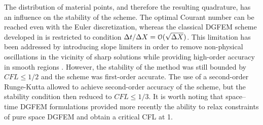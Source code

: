 The distribution of material points, and therefore the resulting quadrature, has an influence on the stability of the scheme. The optimal Courant number can be reached even with the Euler discretization, whereas the classical DGFEM scheme developed in \cite{Chavent_Salzano} is restricted to condition $\Delta t / \Delta X = \mathcal{O}(\sqrt{\Delta X})$. This limitation has been addressed by introducing slope limiters in order to remove non-physical oscillations in the vicinity of sharp solutions while providing high-order accuracy in smooth regions \cite{Chavent_Cockburn}. However, the stability of the method was still bounded by $CFL\leq 1/2$ and the scheme was first-order accurate. The use of a second-order Runge-Kutta \cite{DGFEM_CFL} allowed to achieve second-order accuracy of the scheme, but the stability condition then reduced to $CFL\leq1/3$. It is worth noting that space–time DGFEM formulations \cite{ST_DGFEM1,ST_DGFEM2} provided more recently the ability to relax constraints of pure space DGFEM and obtain a critical CFL at 1.

